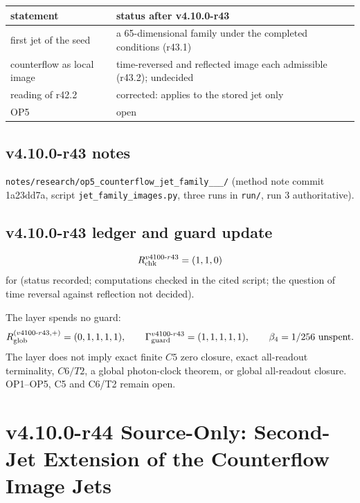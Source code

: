 \begin{center}
\small
\begin{tabular}{@{}>{\raggedright\arraybackslash}p{}>{\raggedright\arraybackslash}p{}@{}}
\toprule
statement & status after v4.10.0-r43\\
\midrule
first jet of the seed & a 65-dimensional family under the completed conditions (r43.1)\\
counterflow as local image & time-reversed and reflected image each admissible (r43.2); undecided\\
reading of r42.2 & corrected: applies to the stored jet only\\
OP5 & open\\
\bottomrule
\end{tabular}
\end{center}

\subsection*{v4.10.0-r43 notes}
\label{subsec:v4100-r43-notes}

\texttt{notes/\allowbreak research/\allowbreak op5\_\allowbreak counterflow\_\allowbreak jet\_\allowbreak family\_\_\_/} (method note commit 1a23dd7a,
script \texttt{jet\_\allowbreak family\_\allowbreak images.py}, three runs in \texttt{run/}, run 3 authoritative).

\subsection*{v4.10.0-r43 ledger and guard update}
\label{subsec:v4100-r43-ledger-guard}

\[
R_{\rm chk}^{v4100\text{-}r43}=(1,1,0)
\]
for (status recorded; computations checked in the cited script; the question of time reversal against reflection not decided).

The layer spends no guard:
\[
R_{\rm glob}^{(v4100\text{-}r43,+)}=(0,1,1,1,1),
\qquad
\Gamma_{\rm guard}^{v4100\text{-}r43}=(1,1,1,1,1),
\qquad
\beta_4=1/256\ \text{unspent}.
\]
The layer does not imply exact finite \(C5\) zero closure, exact all-readout terminality, \(C6/T2\), a global photon-clock theorem,
or global all-readout closure.  OP1--OP5, C5 and C6/T2 remain open.

\clearpage
\section*{v4.10.0-r44 Source-Only: Second-Jet Extension of the Counterflow Image Jets}
\label{sec:v4100-r44-second-jet}

